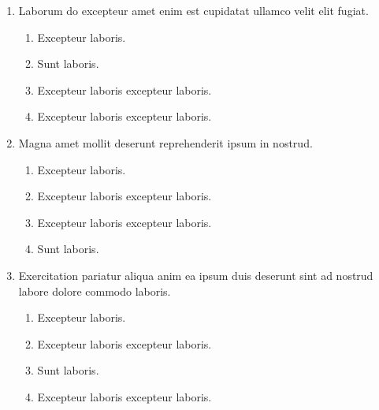 \documentclass[a4paper,12pt]{article}
\begin{document}
\begin{enumerate}[label=\textbf{\arabic*.}]
\item Laborum do excepteur amet enim est cupidatat ullamco velit elit fugiat.
\begin{multicols}{2}
	\begin{enumerate}
		\item  Excepteur laboris.
    
		\item  Sunt laboris.
    
		\item  Excepteur laboris excepteur laboris.
  
		\item  Excepteur laboris excepteur laboris.
    
	\end{enumerate}

\end{multicols}
\item Magna amet mollit deserunt reprehenderit ipsum in nostrud.
\begin{multicols}{2}
	\begin{enumerate}
		\item  Excepteur laboris.
    
		\item  Excepteur laboris excepteur laboris.
    
		\item  Excepteur laboris excepteur laboris.
  
		\item  Sunt laboris.
    
	\end{enumerate}

\end{multicols}
\item Exercitation pariatur aliqua anim ea ipsum duis deserunt sint ad nostrud labore dolore commodo laboris.
\begin{multicols}{2}
	\begin{enumerate}
		\item  Excepteur laboris.
    
		\item  Excepteur laboris excepteur laboris.
  
		\item  Sunt laboris.
    
		\item  Excepteur laboris excepteur laboris.
    
	\end{enumerate}


\end{multicols}
\end{enumerate}
\end{document}
